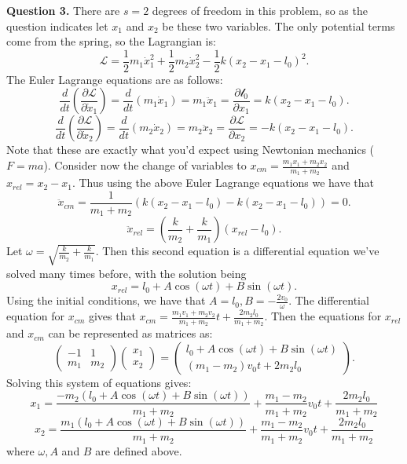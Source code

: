 \documentclass[letterpaper, reqno,11pt]{article}
\begin{document}
{\noindent\bf Question 3.} There are $s=2$ degrees of freedom in this problem, so as the question indicates let $x_1$ and $x_2$ be these two variables. The only potential terms come from the spring, so the Lagrangian is: 
\[
\mathcal L=\frac{1}{2}m_1 \dot x_1^2+\frac{1}{2}m_2\dot x_2^2-\frac{1}{2}k(x_2-x_1-l_0)^2
.\]
The Euler Lagrange equations are as follows: 
 \[
\frac{d}{dt}\left(\frac{\partial \mathcal L}{\partial \dot x_1}\right)=\frac{d}{dt}\left(m_1\dot x_1\right)=m_1\ddot x_1=\frac{\partial \mathcal l_0}{\partial x_1}=k(x_2-x_1-l_0)
.\]
 \[
\frac{d}{dt}\left(\frac{\partial \mathcal L}{\partial \dot x_2}\right)=\frac{d}{dt}\left(m_2\dot x_2\right)=m_2\ddot x_2=\frac{\partial \mathcal L}{\partial x_2}=-k(x_2-x_1-l_0)
.\]
Note that these are exactly what you'd expect using Newtonian mechanics ($F=ma$). Consider now the change of variables to $x_{cm}=\frac{m_1x_1+m_2x_2}{m_1+m_2}$ and $x_{rel}=x_2-x_1$. Thus using the above Euler Lagrange equations we have that 
\[
\ddot x_{cm}=\frac{1}{m_1+m_2}\left( k(x_2-x_1-l_0)-k(x_2-x_1-l_0) \right) =0
.\]
\[
\ddot x_{rel}=\left( \frac{k}{m_2}+\frac{k}{m_1} \right) \left( x_{rel}-l_0 \right)
.\]
Let $\omega =\sqrt{\frac{k}{m_2}+\frac{k}{m_1}} $. Then this second equation is a differential equation we've solved many times before, with the solution being
\[
x_{rel}=l_0+A\cos(\omega t)+B\sin(\omega t)
.\]
Using the initial conditions, we have that $A=l_0, B=-\frac{2v_0}{\omega}$. The differential equation for $x_{cm}$ gives that $x_{cm}=\frac{m_1v_1+m_2v_2}{m_1+m_2}t+\frac{2m_2l_0}{m_1+m_2}$. Then the equations for $x_{rel}$ and $x_{cm}$ can be represented as matrices as: 
\[
    \begin{pmatrix} -1&1\\m_1&m_2 \end{pmatrix} \begin{pmatrix} x_1\\x_2 \end{pmatrix}=\begin{pmatrix} l_0+A\cos(\omega t)+B\sin(\omega t)\\(m_1-m_2)v_0t+2m_2l_0\end{pmatrix}  
.\]
Solving this system of equations gives: 
\[
x_1=\frac{-m_2\left( l_0+A\cos(\omega t)+B\sin(\omega t) \right)}{m_1+m_2} +\frac{m_1-m_2}{m_1+m_2}v_0t+\frac{2m_2l_0}{m_1+m_2}
\]
\[
x_2=\frac{m_1\left( l_0+A\cos(\omega t)+B\sin(\omega t) \right)}{m_1+m_2} +\frac{m_1-m_2}{m_1+m_2}v_0t+\frac{2m_2l_0}{m_1+m_2}
\]
where $\omega, A$ and $B$ are defined above. 
\end{document}
